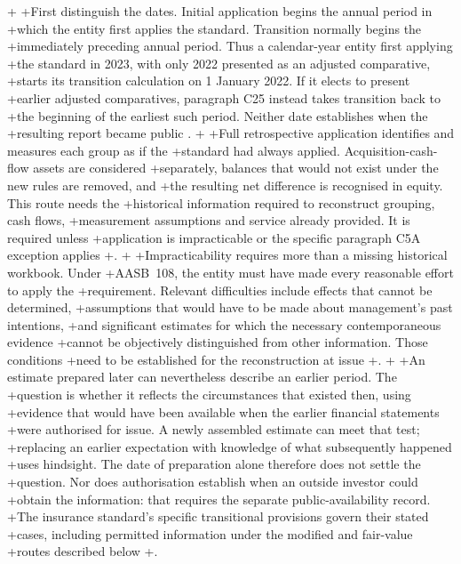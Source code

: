 +
+First distinguish the dates. Initial application begins the annual period in
+which the entity first applies the standard. Transition normally begins the
+immediately preceding annual period. Thus a calendar-year entity first applying
+the standard in 2023, with only 2022 presented as an adjusted comparative,
+starts its transition calculation on 1 January 2022. If it elects to present
+earlier adjusted comparatives, paragraph C25 instead takes transition back to
+the beginning of the earliest such period. Neither date establishes when the
+resulting report became public \citep[paragraphs C2 and C25--C27]{aasb17}.
+
+Full retrospective application identifies and measures each group as if the
+standard had always applied. Acquisition-cash-flow assets are considered
+separately, balances that would not exist under the new rules are removed, and
+the resulting net difference is recognised in equity. This route needs the
+historical information required to reconstruct grouping, cash flows,
+measurement assumptions and service already provided. It is required unless
+application is impracticable or the specific paragraph C5A exception applies
+\citep[paragraphs C3--C5]{aasb17}.
+
+Impracticability requires more than a missing historical workbook. Under
+AASB~108, the entity must have made every reasonable effort to apply the
+requirement. Relevant difficulties include effects that cannot be determined,
+assumptions that would have to be made about management's past intentions,
+and significant estimates for which the necessary contemporaneous evidence
+cannot be objectively distinguished from other information. Those conditions
+need to be established for the reconstruction at issue
+\citep[paragraph~5]{aasb108comp2022}.
+
+An estimate prepared later can nevertheless describe an earlier period. The
+question is whether it reflects the circumstances that existed then, using
+evidence that would have been available when the earlier financial statements
+were authorised for issue. A newly assembled estimate can meet that test;
+replacing an earlier expectation with knowledge of what subsequently happened
+uses hindsight. The date of preparation alone therefore does not settle the
+question. Nor does authorisation establish when an outside investor could
+obtain the information: that requires the separate public-availability record.
+The insurance standard's specific transitional provisions govern their stated
+cases, including permitted information under the modified and fair-value
+routes described below
+\citep[paragraphs~7, 19(a) and 50--53]{aasb108comp2022}.
